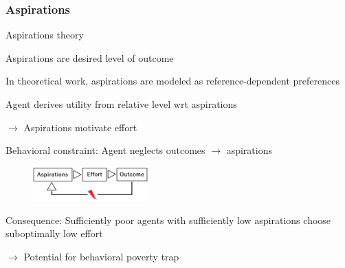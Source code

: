 \documentclass[hideothersubsections, usenames,dvipsnames,11pt]{beamer}
\newenvironment{itemize_2pt}{\itemize\addtolength{\itemsep}{2pt}}{\enditemize}
\begin{document}
\begin{frame}
\frametitle{Aspirations}

Aspirations theory \citep[following][]{Dalton2016}
\begin{itemize_2pt}
	\item Aspirations are \textcolor{bdf}{desired level of outcome}	
	
	\item In theoretical work, aspirations are modeled as \textcolor{bdf}{reference-dependent preferences}
	\begin{itemize_2pt}
		\item Agent derives utility from relative level wrt aspirations
		\item[] $\rightarrow$ Aspirations motivate effort
		\item Behavioral constraint: \textcolor{bdf}{Agent neglects outcomes $\rightarrow$ aspirations}
	\end{itemize_2pt}
	
	\vspace{0.5em}
	
	\begin{figure}[htbp]
		\centering
		\includegraphics[width=12em]{pics/asp.png}
		\label{Aspirations}
	\end{figure}	
	
	\pause
	
	\item Consequence: Sufficiently \textcolor{bdf}{poor agents} with sufficiently \textcolor{bdf}{low aspirations} choose suboptimally low effort
	\item[] $\rightarrow$ Potential for \textcolor{bdf}{behavioral poverty trap}
	\vspace{0.1in}
	
	
\end{itemize_2pt}
\end{frame}
\end{document}
